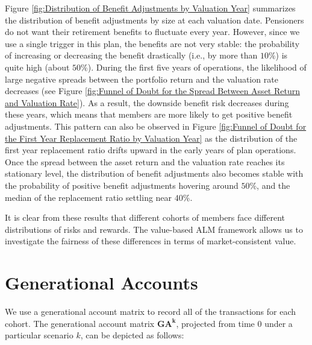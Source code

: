 \documentclass{sfuthesis}
\numberwithin{equation}{chapter}
\begin{document}
	
		\justify
		Figure \ref{fig:Distribution of Benefit Adjustments by Valuation Year} summarizes the distribution of benefit adjustments by size at each valuation date. Pensioners do not want their retirement benefits to fluctuate every year. However, since we use a single trigger in this plan, the benefits are not very stable: the probability of increasing or decreasing  the benefit drastically (i.e., by more than $10\%$) is quite high (about $50\%$). During the first five years of operations, the likelihood of large negative spreads between the portfolio return and the  valuation rate decreases (see Figure \ref{fig:Funnel of Doubt for the Spread Between Asset Return and Valuation Rate}). As a result, the downside benefit risk decreases during these years, which means that members are more likely to get positive benefit adjustments. This pattern can also be observed in Figure \ref{fig:Funnel of Doubt for the First Year Replacement Ratio by Valuation Year} as the distribution of the first year replacement ratio drifts upward in the early years of plan operations. Once the spread between the asset return and the valuation rate reaches its stationary level, the distribution of benefit adjustments also becomes stable with the probability of positive benefit adjustments hovering around $50\%$, and the median of the replacement ratio settling near $40\%$.
	
	
		\justify
		It is clear from these results that different cohorts of members face different distributions of risks and rewards. The value-based ALM framework allows us to investigate the fairness of these differences in terms of market-consistent value.
	
	
	\section{Generational Accounts}
	\label{Generational Accounts}
	
		\justify
		We use a generational account matrix to record all of the transactions for each cohort. The generational account matrix $\boldsymbol{GA^k}$, projected from time $0$ under a particular scenario $k$, can be depicted as follows:
		
\end{document}
